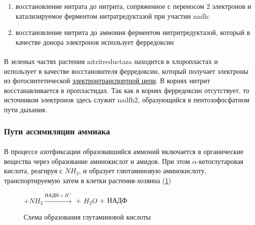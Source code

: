 \begin{enumerate}
	\item восстановление нитрата до нитрита, сопряженное с переносом 2 электронов и катализируемое ферментом нитратредуктазой при участии \gls{nadh}:
	\item восстановление нитрита до аммония ферментом нитритредуктазой, который в качестве донора электронов использует ферредоксин
\end{enumerate}

                                

\paragraph*{}В зеленых частях растения \hypertarget{nitritreductaza}{\gls{nitritreductaza}} находится в хлоропластах и использует в качестве восстановителя ферредоксин, который получает электроны из фотосинтетической \hyperlink{photoetl}{электронтранспортной цепи}. В корнях нитрит восстанавливается в пропластидах. Так как в корнях ферредоксин отсутствует, то источником электронов здесь служит \gls{nadfh2}, образующийся в пентозофосфатном пути дыхания. 

\subsubsection*{Пути ассимиляции аммиака}

\paragraph*{}В процессе азотфиксации образовавшийся аммоний включается в органические вещества через образование аминокислот и амидов. При этом $\alpha$-кетоглутаровая кислота, реагируя с $NH_{3}$, и образует глютаминовую аминокислоту, транспортируемую затем в клетки растения-хозяина (\ris \ref{glutamin})

\begin{figure}[h]
\begin{minipage}[t][0.32\textwidth]{1\linewidth}
\centering
  $+ NH_{3} \xrightarrow{\text{НАДН} + H^{+}}$  + $H_{2}O$ + НАДФ 
\end{minipage}

\caption{Схема образования глутаминовой кислоты}
\label{glutamin}
\end{figure}


